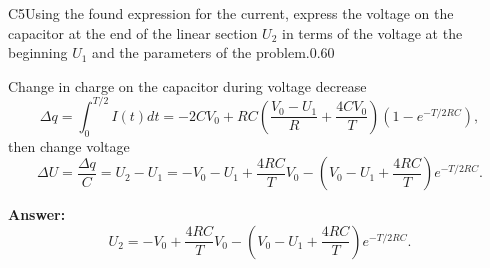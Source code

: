 \documentclass[11pt,a4paper]{article}
\begin{document}
\begin{solcard}{C5}{Using the found expression for the current, express the voltage on the capacitor at the end of the linear section $U_2$ in terms of the voltage at the beginning $U_1$ and the parameters of the problem.}{0.60}

Change in charge on the capacitor during voltage decrease $$ \Delta q = \int_0 ^{T/2} I(t) dt = - 2 C V_0 + RC \left( \frac{V_0- U_1}{R} + \frac{4 CV_0 }{T} \right) \left(1 - e ^{-T/2RC} \right), $$ then change voltage $$ \Delta U = \frac{\Delta q}{C} = U_2 - U_1= -V_0 - U_1 + \frac{4RC}{T} V_0 - \left(V_0 - U_1 + \frac{4 RC}{T} \right) e^{-T/2RC}. $$

\par\smallskip\noindent\textbf{Answer:} $$ U_2 = - V_0+ \frac{4RC}{T} V_0 - \left(V_0 - U_1 + \frac{4 RC}{T} \right) e^{-T/2RC}. $$
\end{solcard}
\end{document}
